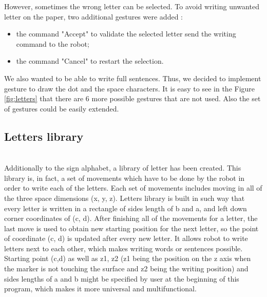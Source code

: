 However, sometimes the wrong letter can be selected. To avoid writing unwanted letter on the paper, two additional gestures were added :
\begin{itemize}
	\item the command "Accept" to validate the selected letter send the writing command to the robot;
	\item the command "Cancel" to restart the selection.
\end{itemize}

We also wanted to be able to write full sentences. Thus, we decided to implement gesture to draw the dot and the space characters. It is easy to see in the Figure \ref{fig:letters} that there are 6 more possible gestures that are not used. Also the set of gestures could be easily extended.

\subsection{Letters library}

\mbox{}\\
Additionally to the sign alphabet, a library of letter has been created. This library is, in fact, a set of movements which have to be done by the robot in order to write each of the letters. Each set of movements includes moving in all of the three space dimensions (x, y, z). Letters library is built in such way that every letter is written in a rectangle of sides length of b and a, and left down corner coordinates of (c, d). After finishing all of the movements for a letter, the last move is used to obtain new starting position for the next letter, so the point of coordinate (c, d) is updated after every new letter. It allows robot to write letters next to each other, which makes writing words or sentences possible. Starting point (c,d) as well as z1, z2 (z1 being the position on the z axis when the marker is not touching the surface and z2 being the writing position) and sides lengths of a and b might be specified by user at the beginning of this program, which makes it more universal and multifunctional.\\



